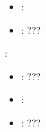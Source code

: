 \begin{itemize}
{\begin{itemize}
                \item \optionDefaultValue{}: 
                \item \optionDescrption{}: ???
           \end{itemize}
    \item {}:
           \begin{itemize}
                \item \optionPossibleValues{}: ???
                \item \optionDefaultValue{}: 
                \item \optionDescrption{}: ???
           \end{itemize}
    }
\end{itemize}


